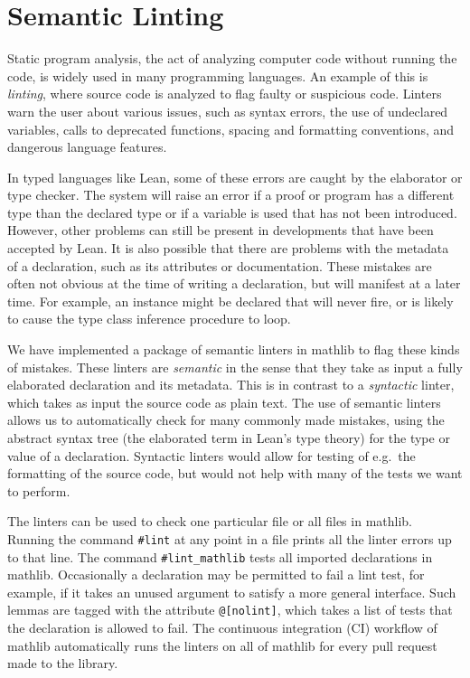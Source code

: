\documentclass[runningheads]{llncs}
\newcommand{\mathlib}{\textsf{mathlib}\xspace}
\newcommand{\lean}[1]{\lstinline[language=lean]{#1}}
\begin{document}
\section{Semantic Linting}
\label{section:linting}

Static program analysis,
the act of analyzing computer code without running the code,
is widely used in many programming languages.
An example of this is \emph{linting},
where source code is analyzed to flag faulty or suspicious code.
Linters warn the user about various issues,
such as syntax errors,
the use of undeclared variables,
calls to deprecated functions,
spacing and formatting conventions,
and dangerous language features.

In typed languages like Lean,
some of these errors are caught by the elaborator or type checker.
The system will raise an error
if a proof or program has a different type than the declared type
or if a variable is used that has not been introduced.
However, other problems can still be present
in developments that have been accepted by Lean.
It is also possible that there are problems with the metadata of a declaration,
such as its attributes or documentation.
These mistakes are often not obvious at the time of writing a declaration,
but will manifest at a later time.
For example, an instance might be declared that will never fire,
or is likely to cause the type class inference procedure to loop.

We have implemented a package of semantic linters in \mathlib
to flag these kinds of mistakes.
These linters are \emph{semantic} in the sense that
they take as input a fully elaborated declaration and its metadata.
This is in contrast to a \emph{syntactic} linter,
which takes as input the source code as plain text.
The use of semantic linters allows us
to automatically check for many commonly made mistakes,
using the abstract syntax tree (the elaborated term in Lean's type theory) for the type or value of a declaration.
Syntactic linters would allow for testing of
e.g.\ the formatting of the source code,
but would not help with many of the tests we want to perform.

The linters can be  used
to check one particular file or all files in \mathlib.
Running the command \lean{#lint} at any point in a file
prints all the linter errors up to that line.
The command \lean{#lint_mathlib} tests all imported declarations in \mathlib.
Occasionally a declaration may be permitted to fail a lint test,
for example, if it takes an unused argument to satisfy a more general interface.
Such lemmas are tagged with the attribute \lean{@[nolint]},
which takes a list of tests that the declaration is allowed to fail.
The continuous integration (CI) workflow of \mathlib
automatically runs the linters on all of \mathlib
for every pull request made to the library.
\end{document}
